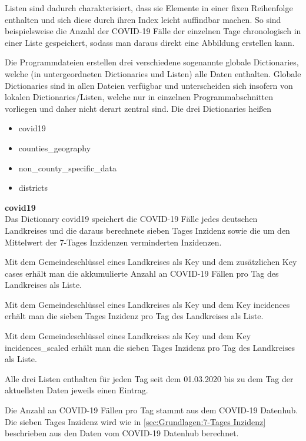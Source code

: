 Listen sind dadurch charakterisiert, dass sie Elemente in einer fixen Reihenfolge enthalten und sich diese durch ihren Index leicht auffindbar machen. So sind beispielsweise die Anzahl der COVID-19 Fälle der einzelnen Tage chronologisch in einer Liste gespeichert, sodass man daraus direkt eine Abbildung erstellen kann.


Die Programmdateien erstellen drei verschiedene sogenannte globale Dictionaries, welche (in untergeordneten Dictionaries und Listen) alle Daten enthalten. Globale Dictionaries sind in allen Dateien verfügbar und unterscheiden sich insofern von lokalen Dictionaries/Listen, welche nur in einzelnen Programmabschnitten vorliegen und daher nicht derart zentral sind.
Die drei Dictionaries heißen
\begin{itemize}
    \item covid19
    \item counties\_geography
    \item non\_county\_specific\_data
    \item districts
\end{itemize}

\textbf{covid19}\\
Das Dictionary covid19 speichert die COVID-19 Fälle jedes deutschen Landkreises und die daraus berechnete sieben Tages Inzidenz sowie die um den Mittelwert der 7-Tages Inzidenzen verminderten Inzidenzen.

Mit dem Gemeindeschlüssel eines Landkreises als Key und dem zusätzlichen Key \glqq{}cases\grqq{} erhält man die akkumulierte Anzahl an COVID-19 Fällen pro Tag des Landkreises als Liste.

Mit dem Gemeindeschlüssel eines Landkreises als Key und dem Key \glqq{}incidences\grqq{} erhält man die sieben Tages Inzidenz pro Tag des Landkreises als Liste.

Mit dem Gemeindeschlüssel eines Landkreises als Key und dem Key \glqq{}incidences\_scaled\grqq{} erhält man die sieben Tages Inzidenz pro Tag des Landkreises als Liste.

Alle drei Listen enthalten für jeden Tag seit dem 01.03.2020 bis zu dem Tag der aktuellsten Daten jeweils einen Eintrag.

Die Anzahl an COVID-19 Fällen pro Tag stammt aus dem \glqq{}COVID-19 Datenhub\grqq{}. Die sieben Tages Inzidenz wird wie in \autoref{sec:Grundlagen:7-Tages Inzidenz} beschrieben aus den Daten vom COVID-19 Datenhub berechnet.


